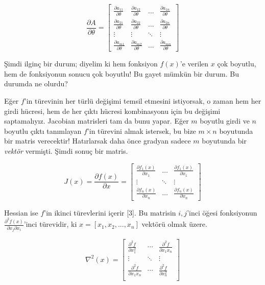 \documentclass[12pt,fleqn]{article}\usepackage{../../common}
\begin{document}
$$ 
\frac{\partial A}{\partial \theta} = 
\left[\begin{array}{cccc}
\frac{\partial a_{11}}{\partial \theta} & 
\frac{\partial a_{12}}{\partial \theta} & \dots & 
\frac{\partial a_{1n}}{\partial \theta} 
\\
\frac{\partial a_{21}}{\partial \theta} & 
\frac{\partial a_{22}}{\partial \theta} &  \dots & 
\frac{\partial a_{2n}}{\partial \theta}  
\\
\vdots & \vdots & \ddots & \vdots 
\\
\frac{\partial a_{m1}}{\partial \theta} & 
\frac{\partial a_{m2}}{\partial \theta} &  \dots & 
\frac{\partial a_{mn}}{\partial \theta}  
\end{array}\right]
$$

Şimdi ilginç bir durum; diyelim ki hem fonksiyon $f(x)$'e verilen $x$
çok boyutlu, hem de fonksiyonun sonucu çok boyutlu! Bu gayet mümkün bir
durum. Bu durumda ne olurdu? 

Eğer $f$'in türevinin her türlü değişimi temsil etmesini istiyorsak, o
zaman hem her girdi hücresi, hem de her çıktı hücresi kombinasyonu için bu
değişimi saptamalıyız. Jacobian matrisleri tam da bunu yapar. Eğer $m$
boyutlu girdi ve $n$ boyutlu çıktı tanımlayan $f$'in türevini almak
istersek, bu bize $m \times n$ boyutunda bir matris verecektir!
Hatırlarsak daha önce gradyan sadece $m$ boyutunda bir {\em vektör}
vermişti. Şimdi sonuç bir matris. 

$$ 
J(x) = \frac{\partial f(x)}{\partial x} =
\left[\begin{array}{ccc}
\frac{\partial f_{1}(x)}{\partial x_1} & \dots & 
\frac{\partial f_{1}(x)}{\partial x_1} 
\\
\vdots & \ddots & \vdots 
\\
\frac{\partial f_{n}(x)}{\partial x_n} & \dots & 
\frac{\partial f_{n}(x)}{\partial x_n}  
\end{array}\right]
 $$

Hessian ise $f$'in ikinci türevlerini içerir [3]. Bu matrisin $i,j$'inci
öğesi fonksiyonun $\frac{\partial^2 f(x)}{\partial x_j \partial x_i}$'inci
türevidir, ki $x = [x_1,x_2,...,x_n]$ vektörü olmak üzere. 

$$
\nabla^2 (x) = 
\left[\begin{array}{rrr}
\frac{\partial^2 f}{\partial x_1^2} & \cdots & \frac{\partial^2 f}{\partial x_1x_n}\\
\vdots & \ddots & \vdots \\
\frac{\partial^2 f}{\partial x_1x_n} & \cdots & \frac{\partial^2 f}{\partial x_n^2}\\
\end{array}\right]
$$
\end{document}
